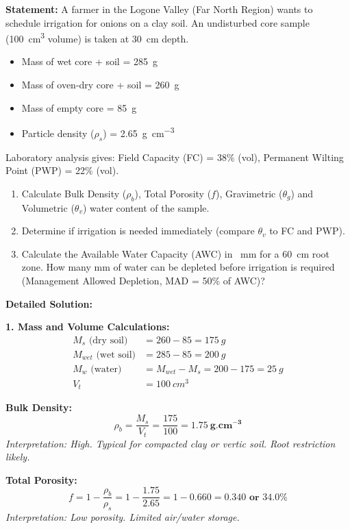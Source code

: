 \documentclass[11pt]{article}
\begin{document}
\begin{exoresolu}
\textbf{Statement:} A farmer in the Logone Valley (Far North Region) wants to schedule irrigation for onions on a clay soil. An undisturbed core sample (\SI{100}{cm^3} volume) is taken at \SI{30}{cm} depth. 
\begin{itemize}
\item Mass of wet core + soil = \SI{285}{g}
\item Mass of oven-dry core + soil = \SI{260}{g}
\item Mass of empty core = \SI{85}{g}
\item Particle density ($\rho_s$) = \SI{2.65}{g.cm^{-3}}
\end{itemize}
Laboratory analysis gives: Field Capacity (FC) = 38\% (vol), Permanent Wilting Point (PWP) = 22\% (vol).
\begin{enumerate}
\item Calculate Bulk Density ($\rho_b$), Total Porosity ($f$), Gravimetric ($\theta_g$) and Volumetric ($\theta_v$) water content of the sample.
\item Determine if irrigation is needed immediately (compare $\theta_v$ to FC and PWP).
\item Calculate the Available Water Capacity (AWC) in \SI{}{mm} for a \SI{60}{cm} root zone. How many mm of water can be depleted before irrigation is required (Management Allowed Depletion, MAD = 50\% of AWC)?
\end{enumerate}

\tcblower
\textbf{Detailed Solution:}

\noindent\textbf{1. Mass and Volume Calculations:}
\begin{align*}
M_s \text{ (dry soil)} &= 260 - 85 = \SI{175}{g} \\
M_{wet} \text{ (wet soil)} &= 285 - 85 = \SI{200}{g} \\
M_w \text{ (water)} &= M_{wet} - M_s = 200 - 175 = \SI{25}{g} \\
V_t &= \SI{100}{cm^3}
\end{align*}

\noindent\textbf{Bulk Density:}
\[
\rho_b = \frac{M_s}{V_t} = \frac{175}{100} = \mathbf{1.75\ g.cm^{-3}}
\]
\textit{Interpretation: High. Typical for compacted clay or vertic soil. Root restriction likely.}

\noindent\textbf{Total Porosity:}
\[
f = 1 - \frac{\rho_b}{\rho_s} = 1 - \frac{1.75}{2.65} = 1 - 0.660 = \mathbf{0.340 \text{ or } 34.0\%}
\]
\textit{Interpretation: Low porosity. Limited air/water storage.}


\end{exoresolu}
\end{document}
